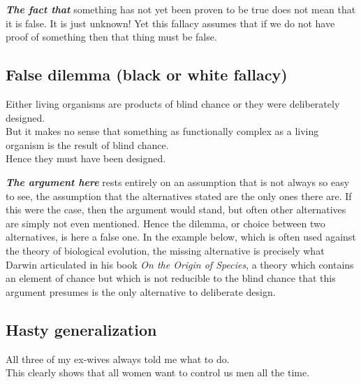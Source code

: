 \documentclass[12pt, openany]{book}
\begin{document}
\textbf{\emph{The fact that}} something has not yet been proven to be true does not mean that it is false. It is just unknown! Yet this fallacy assumes that if we do not have proof of something then that thing must be false.

\hypertarget{false-dilemma-black-or-white-fallacy}{%
\subsection*{False dilemma (black or white fallacy)}\label{false-dilemma-black-or-white-fallacy}}


\begin{center}

\begin{argument}

Either living organisms are products of blind chance or they were deliberately designed.\\
But it makes no sense that something as functionally complex as a living organism is the result of blind chance.\\

Hence they must have been designed.

\end{argument}

\end{center}

\textbf{\emph{The argument here}} rests entirely on an assumption that is not always so easy to see, the assumption that the alternatives stated are the only ones there are. If this were the case, then the argument would stand, but often other alternatives are simply not even mentioned. Hence the dilemma, or choice between two alternatives, is here a false one. In the example below, which is often used against the theory of biological evolution, the missing alternative is precisely what Darwin articulated in his book \emph{On the Origin of Species}, a theory which contains an element of chance but which is not reducible to the blind chance that this argument presumes is the only alternative to deliberate design.

\hypertarget{hasty-generalization}{%
\subsection*{Hasty generalization}\label{hasty-generalization}}


\begin{center}

\begin{argument}

All three of my ex-wives always told me what to do.\\

This clearly shows that all women want to control us men all the time.

\end{argument}

\end{center}
\end{document}
